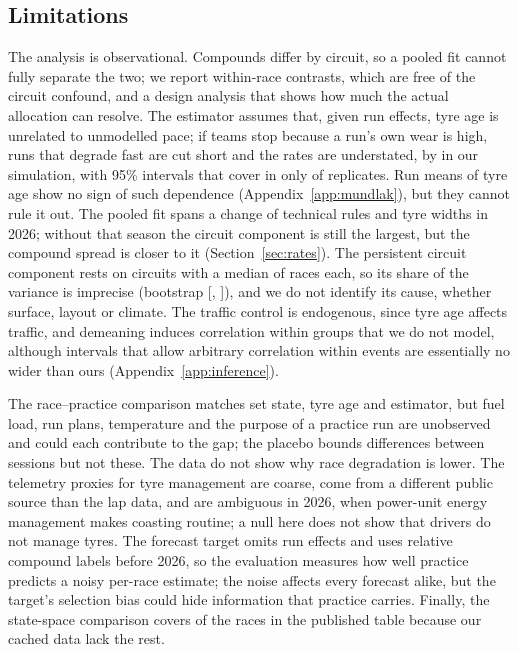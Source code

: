\subsection{Limitations}\label{sec:limits}

The analysis is observational.
Compounds differ by circuit, so a pooled fit cannot fully separate the two; we report within-race contrasts, which are free of the circuit confound, and a design analysis that shows how much the actual allocation can resolve.
The estimator assumes that, given run effects, tyre age is unrelated to unmodelled pace; if teams stop because a run's own wear is high, runs that degrade fast are cut short and the rates are understated, by \RecExactWearBiasAbs\spl{} in our simulation, with 95\% intervals that cover in only \RecExactWearCov{} of replicates.
Run means of tyre age show no sign of such dependence (Appendix~\ref{app:mundlak}), but they cannot rule it out.
The pooled fit spans a change of technical rules and tyre widths in 2026; without that season the circuit component is still the largest, but the compound spread is closer to it (Section~\ref{sec:rates}).
The persistent circuit component rests on \PooledNCircuits{} circuits with a median of \PooledEventsPerCircuit{} races each, so its share of the variance is imprecise (bootstrap [\PersistShareBootLo, \PersistShareBootHi]), and we do not identify its cause, whether surface, layout or climate.
The traffic control is endogenous, since tyre age affects traffic, and demeaning induces correlation within groups that we do not model, although intervals that allow arbitrary correlation within events are essentially no wider than ours (Appendix~\ref{app:inference}).

The race--practice comparison matches set state, tyre age and estimator, but fuel load, run plans, temperature and the purpose of a practice run are unobserved and could each contribute to the gap; the placebo bounds differences between sessions but not these.
The data do not show why race degradation is lower.
The telemetry proxies for tyre management are coarse, come from a different public source than the lap data, and are ambiguous in 2026, when power-unit energy management makes coasting routine; a null here does not show that drivers do not manage tyres.
The forecast target omits run effects and uses relative compound labels before 2026, so the evaluation measures how well practice predicts a noisy per-race estimate; the noise affects every forecast alike, but the target's selection bias could hide information that practice carries.
Finally, the state-space comparison covers \JournalRacesScored{} of the \JournalRacesTotal{} races in the published table because our cached data lack the rest.

